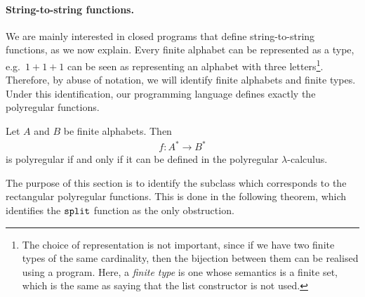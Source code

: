 \paragraph*{String-to-string functions.} 
We are mainly interested in closed programs that define string-to-string functions, as we now explain. 
  Every finite alphabet can be represented as a type, e.g.~$1 + 1 + 1$ can be seen as representing an alphabet with three letters\footnote{The choice of representation is not important, since if we have two finite types of the same cardinality, then the bijection between them can be realised using a program. Here, a \emph{finite type}  is one whose semantics is a finite set, which is the same as saying that the list constructor is not used.}. Therefore, by abuse of notation, we will identify finite alphabets and finite types. Under this identification, our programming language defines exactly the polyregular functions.
  
  \begin{theorem}
      Let $A$ and $B$ be finite alphabets. Then
        \begin{align*}
    f : A^* \to B^*
    \end{align*}
    is polyregular if and only if it can be defined in the polyregular $\lambda$-calculus.
    \end{theorem}
  
The purpose of this section is to identify the subclass which corresponds to the rectangular polyregular functions. This is done in the following theorem, which identifies the $\mathtt{split}$ function as the only obstruction.




